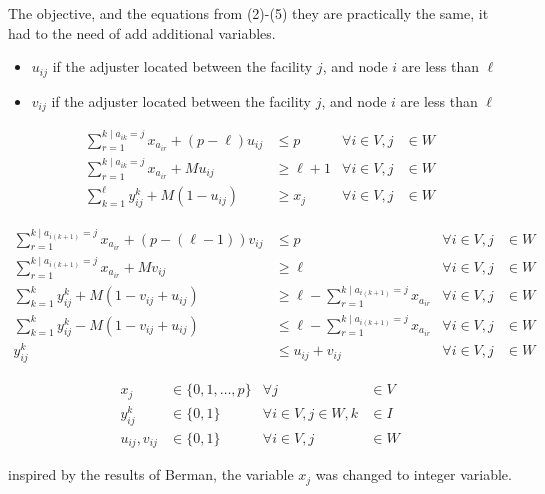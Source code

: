 \begin{frame}[allowframebreaks]
  The objective, and the equations from (2)-(5) they are practically the same,
  it had to the need of add additional variables.
  \begin{itemize}
  \item $u_{ij}$ if the adjuster located between the facility $j$, and node $i$ are less than $\ell$
  \item $v_{ij}$ if the adjuster located between the facility $j$, and node $i$ are less than $\ell$
  \end{itemize}


  \begin{align}
    \sum_{r = 1}^{k \mid a_{ik}=j}{x_{a_{ir}}} + (p-\ell) u_{ij} & \leq p & \forall i \in V, j &\in W \\
    \sum_{r = 1}^{k \mid a_{ik}=j}{x_{a_{ir}}} + M u_{ij} & \geq \ell+1   & \forall i \in V, j &\in W \\
    \sum_{k = 1}^{\ell}{y_{ij}^{k}} + M (1 - u_{ij}) & \geq x_j           & \forall i \in V, j &\in W
  \end{align}
  
  \begin{align}
    \sum_{r = 1}^{k \mid a_{i(k+1)}=j}{x_{a_{ir}}} + (p-(\ell-1)) v_{ij} & \leq p                                     & \forall i \in V, j &\in W\\
    \sum_{r = 1}^{k \mid a_{i(k+1)}=j}{x_{a_{ir}}} + M v_{ij}         & \geq \ell                                     & \forall i \in V, j &\in W\\
    \sum_{k=1}^{k}{y_{ij}^{k}} + M (1 - v_{ij} + u_{ij}) & \geq \ell - \sum_{r = 1}^{k \mid a_{i(k+1)}=j}{x_{a_{ir}}} & \forall i \in V, j &\in W\\
    \sum_{k=1}^{k}{y_{ij}^{k}} - M (1 - v_{ij} + u_{ij}) & \leq \ell - \sum_{r = 1}^{k \mid a_{i(k+1)}=j}{x_{a_{ir}}} & \forall i \in V, j &\in W\\
    y_{ij}^{k} & \leq u_{ij} + v_{ij}  &       \forall i \in V,j &\in W 
  \end{align}
  
  \begin{align*}
    x_j & \in \{0,1,\ldots,p\}         &               \forall j &\in V \\
    y_{ij}^{k} & \in \{0,1\}           & \forall i\in V,j\in W,k &\in I \\
    u_{ij},v_{ij} & \in \{0,1\}        &       \forall i \in V,j &\in W
  \end{align*}

  inspired by the results of Berman, the variable $x_j$ 
  was changed to integer variable.
\end{frame}
